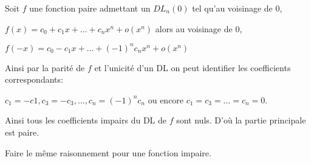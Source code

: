 \documentclass[a4paper, 12pt]{article}
\begin{document}
\begin{demonstration}
    Soit $f$ une fonction paire admettant un $DL_n(0)$ tel qu'au voisinage de 0,

    $f(x) = c_0 + c_1x + \ldots + c_nx^n + o(x^n)$ alors au voisinage de 0,

    $f(-x) = c_0 - c_1x + \ldots + (-1)^nc_nx^n + o(x^n)$

    Ainsi par la parité de $f$ et l'unicité d'un DL on peut identifier les coefficients correspondants:

    $c_1 = -c1, c_3 = -c_3, \ldots, c_n = (-1)^nc_n$ ou encore $c_1 = c_3 = \ldots = c_n = 0$.

    Ainsi tous les coefficients impairs du DL de $f$ sont nuls. D'où la partie principale est paire.

    Faire le même raisonnement pour une fonction impaire.
\end{demonstration}
\end{document}
